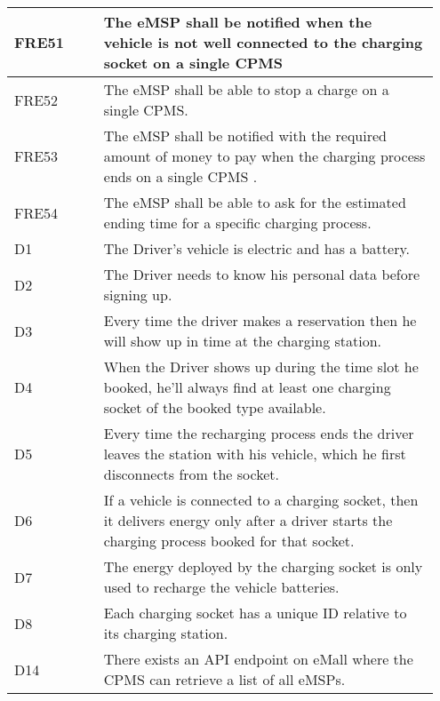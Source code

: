 {\begin{longtable}{|p{0.20\linewidth}p{0.75\linewidth} |}
    \hline
    \rowcolor{bluepoli!15} FRE51 & The eMSP shall be notified when the vehicle is not well connected to the charging socket on a single CPMS \\
    \hline
    \rowcolor{bluepoli!15} FRE52 & The eMSP shall be able to stop a charge on a single CPMS. \\
    \hline
    \rowcolor{bluepoli!15} FRE53 &  The eMSP shall be notified with the required amount of money to pay when the charging process ends on a single CPMS .\\
    \hline
    \rowcolor{bluepoli!15} FRE54 & The eMSP shall be able to ask for the estimated ending time for a specific charging process. \\
    \hline
    \rowcolor{bluepoli!5} D1 & The Driver's vehicle is electric and has a battery.\\
    \hline
    \rowcolor{bluepoli!5} D2 & The Driver needs to know his personal data before signing up.\\
    \hline
    \rowcolor{bluepoli!5} D3 & Every time the driver makes a reservation then he will show up in time at the charging station.\\
    \hline
    \rowcolor{bluepoli!5} D4 & When the Driver shows up during the time slot he booked, he’ll always find at least one charging socket of the booked type available.\\
    \hline
    \rowcolor{bluepoli!5} D5 & Every time the recharging process ends the driver leaves the station with his vehicle, which he first disconnects from the socket.\\
    \hline    
    \rowcolor{bluepoli!5} D6& If a vehicle is connected to a charging socket, then it delivers energy only after a driver starts the charging process booked for that socket.\\
    \hline
    \rowcolor{bluepoli!5} D7 & The energy deployed by the charging socket is only used to recharge the vehicle batteries.\\
    \hline 
    \rowcolor{bluepoli!5} D8 &
    Each charging socket has a unique ID relative to its charging station.\\
    \hline
    \rowcolor{bluepoli!5} D14 & There exists an API endpoint on eMall where the CPMS can retrieve a list of all eMSPs. \\
    \hline
\end{longtable}}

